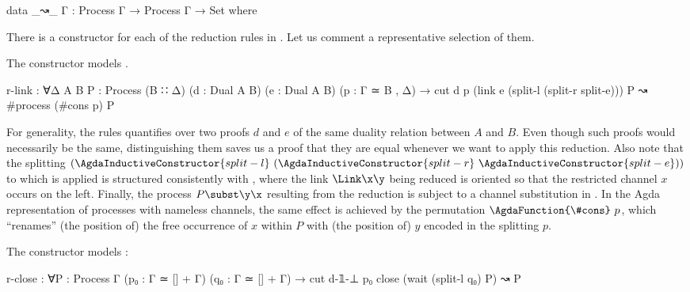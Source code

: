\begin{AgdaAlign}
\begin{code}
data _↝_ {Γ} : Process Γ → Process Γ → Set where
\end{code}

There is a constructor for each of the reduction rules in .
Let us comment a representative selection of them.

The constructor  models \RLink. 

\begin{code}
  r-link      : ∀{Δ A B} {P : Process (B ∷ Δ)}
                (d : Dual A B) (e : Dual A B) (p : Γ ≃ B , Δ) →
                cut d p (link e (split-l (split-r split-e))) P ↝ #process (#cons p) P
\end{code}

For generality, the rules quantifies over two proofs $d$ and $e$ of the same
duality relation between $A$ and $B$. Even though such proofs would necessarily
be the same, distinguishing them saves us a proof that they are equal whenever
we want to apply this reduction. 
%
Also note that the splitting
$(\AgdaInductiveConstructor{split-l}~(\AgdaInductiveConstructor{split-r}~\AgdaInductiveConstructor{split-e}))$
to which  is applied is structured consistently
with , where the link $\Link\x\y$ being reduced is oriented
so that the restricted channel $x$ occurs on the left. 
%
Finally, the process $P\subst\y\x$ resulting from the reduction is subject to a
channel substitution in . In the Agda representation of
processes with nameless channels, the same effect is achieved by the permutation
$\AgdaFunction{\#cons}~p$, which ``renames'' (the position of) the free
occurrence of $x$ within $P$ with (the position of) $y$ encoded in the splitting
$p$.

The constructor  models \RClose:

\begin{code}
  r-close     : ∀{P : Process Γ} (p₀ : Γ ≃ [] + Γ) (q₀ : Γ ≃ [] + Γ) →
                cut d-𝟙-⊥ p₀ close (wait (split-l q₀) P) ↝ P
\end{code}


\end{AgdaAlign}
